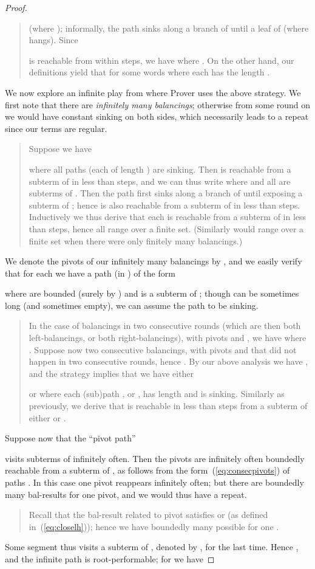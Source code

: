 \documentclass{llncs}
\begin{document}
\begin{proof}
\begin{quote}
{(where ); informally, the path 
sinks along a branch of  until a leaf 
of  (where  hangs). Since 

is reachable from  within  steps, we have
 where .
On the other hand, our definitions yield 
that  for some words
 where each has the length . 
}
\end{quote}
We now
explore an infinite play from  where Prover uses the
above strategy. We first note that
there are \emph{infinitely many balancings};
otherwise from some round on we would have constant 
sinking on both sides, which necessarily leads to a repeat since our
terms are regular.
\begin{quote}
	{\small	
Suppose we have 

where all paths  (each of length )
are sinking. Then  is reachable from a subterm of  
in less than 
steps, and we can thus write   where 
and all  are subterms of .
Then the path  first sinks along a
branch of  until exposing a subterm of ; hence 
 is also reachable from a subterm of  
in less than  steps. Inductively we thus derive 
that each
 is reachable from a subterm of  in less than 
steps, hence all  range over a finite
set. (Similarly  
would range over a finite
set when there were only finitely many balancings.)
}
\end{quote}
We denote the pivots of our infinitely many balancings by
, and we easily verify
that for each  we have a path  
 (in )
of the form  

where  are bounded (surely by ) and 
 is a subterm of ; though  can be sometimes long (and
sometimes empty), we can
assume the path  to be sinking.

\begin{quote}
	{\small	
In the case of balancings in two consecutive rounds
(which are then both left-balancings, or both right-balancings), 
with pivots 
and , we have  where .
Suppose now two consecutive balancings, with pivots
 and 
that did not happen in two consecutive rounds, hence .
By our above analysis we have 
, and the strategy implies 
that we have either

or  where each (sub)path 
, or
,
has length  and is sinking.
Similarly as previously, we derive that  is reachable in
less than  steps from a subterm of either  or
.
		}
	\end{quote}
Suppose now that the ``pivot path''
\begin{center}

\end{center} 
visits
subterms of  infinitely often.
Then the pivots  are
infinitely often boundedly reachable from a subterm of ,
as follows
from the form~(\ref{eq:consecpivots})
of paths . In this case one
pivot reappears infinitely often;
but there
are boundedly many bal-results for one pivot, and we would thus have a repeat.
\begin{quote}
	{\small	
Recall that the bal-result  related to pivot  satisfies
 or 
(as defined in~(\ref{eq:closelh})); hence we have boundedly many
possible  for one .
		}
	\end{quote}
Some segment  thus visits a subterm
of , denoted by , for the last time. 
Hence ,
and 
the infinite path  is
root-performable; for  we have


\end{proof}
\end{document}
